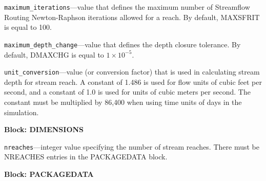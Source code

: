 \begin{description}
\item \texttt{maximum\_iterations}---value that defines the maximum number of Streamflow Routing Newton-Raphson iterations allowed for a reach. By default, MAXSFRIT is equal to 100.

\item \texttt{maximum\_depth\_change}---value that defines the depth closure tolerance. By default, DMAXCHG is equal to $1 \times 10^{-5}$.

\item \texttt{unit\_conversion}---value (or conversion factor) that is used in calculating stream depth for stream reach. A constant of 1.486 is used for flow units of cubic feet per second, and a constant of 1.0 is used for units of cubic meters per second. The constant must be multiplied by 86,400 when using time units of days in the simulation.

\end{description}
\item \textbf{Block: DIMENSIONS}

\begin{description}
\item \texttt{nreaches}---integer value specifying the number of stream reaches.  There must be NREACHES entries in the PACKAGEDATA block.

\end{description}
\item \textbf{Block: PACKAGEDATA}

